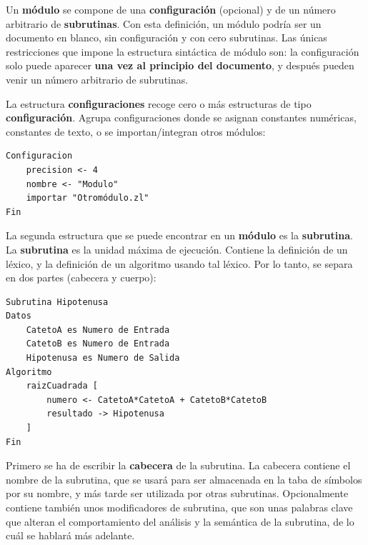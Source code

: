 \documentclass{report}
\begin{document}
	\vspace{10px}
	
	Un \textbf{módulo} se compone de una \textbf{configuración} (opcional) y de un número arbitrario de \textbf{subrutinas}. Con esta definición, un módulo podría ser un documento en blanco, sin configuración y con cero subrutinas. Las únicas restricciones que impone la estructura sintáctica de módulo son: la configuración solo puede aparecer \textbf{una vez al principio del documento}, y después pueden venir un número arbitrario de subrutinas. 
	
	\vspace{10px}
	
	La estructura \textbf{configuraciones} recoge cero o más estructuras de tipo \textbf{configuración}. Agrupa configuraciones donde se asignan constantes numéricas, constantes de texto, o se importan/integran otros módulos:
	
	\vspace{10px}
	
\begin{BVerbatim}
Configuracion
	precision <- 4
	nombre <- "Modulo"
	importar "Otromódulo.zl"
Fin
\end{BVerbatim}
	
	La segunda estructura que se puede encontrar en un \textbf{módulo} es la \textbf{subrutina}. La \textbf{subrutina} es la unidad máxima de ejecución. Contiene la definición de un léxico, y la definición de un algoritmo usando tal léxico. Por lo tanto, se separa en dos partes (cabecera y cuerpo):
	
\begin{BVerbatim}
Subrutina Hipotenusa
Datos
	CatetoA es Numero de Entrada
	CatetoB es Numero de Entrada
	Hipotenusa es Numero de Salida
Algoritmo
	raizCuadrada [
		numero <- CatetoA*CatetoA + CatetoB*CatetoB
		resultado -> Hipotenusa
	]
Fin
\end{BVerbatim}

	\vspace{10px}
	
	Primero se ha de escribir la \textbf{cabecera} de la subrutina. La cabecera contiene el nombre de la subrutina, que se usará para ser almacenada en la taba de símbolos por su nombre, y más tarde ser utilizada por otras subrutinas. Opcionalmente contiene también unos modificadores de subrutina, que son unas palabras clave que alteran el comportamiento del análisis y la semántica de la subrutina, de lo cuál se hablará más adelante.
	
	\vspace{10px}
	
\end{document}
